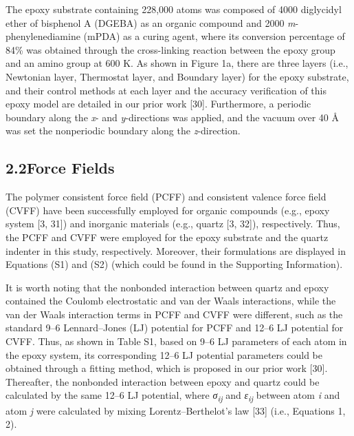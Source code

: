 \documentclass{article}
\begin{document}
The epoxy substrate containing 228,000 atoms was composed of 4000 diglycidyl ether of bisphenol A (DGEBA) as an organic compound and 2000 \emph{m}-phenylenediamine (mPDA) as a curing agent, where its conversion percentage of 84\% was obtained through the cross-linking reaction between the epoxy group and an amino group at 600 K. As shown in Figure 1a, there are three layers (i.e., Newtonian layer, Thermostat layer, and Boundary layer) for the epoxy substrate, and their control methods at each layer and the accuracy verification of this epoxy model are detailed in our prior work [30]. Furthermore, a periodic boundary along the \emph{x}- and \emph{y}-directions was applied, and the vacuum over 40 Å was set the nonperiodic boundary along the \emph{z}-direction.

\subsection*{2.2\quad Force Fields}

The polymer consistent force field (PCFF) and consistent valence force field (CVFF) have been successfully employed for organic compounds (e.g., epoxy system [3, 31]) and inorganic materials (e.g., quartz [3, 32]), respectively. Thus, the PCFF and CVFF were employed for the epoxy substrate and the quartz indenter in this study, respectively. Moreover, their formulations are displayed in Equations (S1) and (S2) (which could be found in the Supporting Information).

It is worth noting that the nonbonded interaction between quartz and epoxy contained the Coulomb electrostatic and van der Waals interactions, while the van der Waals interaction terms in PCFF and CVFF were different, such as the standard 9–6 Lennard–Jones (LJ) potential for PCFF and 12–6 LJ potential for CVFF. Thus, as shown in Table S1, based on 9–6 LJ parameters of each atom in the epoxy system, its corresponding 12–6 LJ potential parameters could be obtained through a fitting method, which is proposed in our prior work [30]. Thereafter, the nonbonded interaction between epoxy and quartz could be calculated by the same 12–6 LJ potential, where \emph{σ}\textsubscript{\emph{ij}} and \emph{ε}\textsubscript{\emph{ij}} between atom \emph{i} and atom \emph{j} were calculated by mixing Lorentz–Berthelot’s law [33] (i.e., Equations 1, 2).
\end{document}

